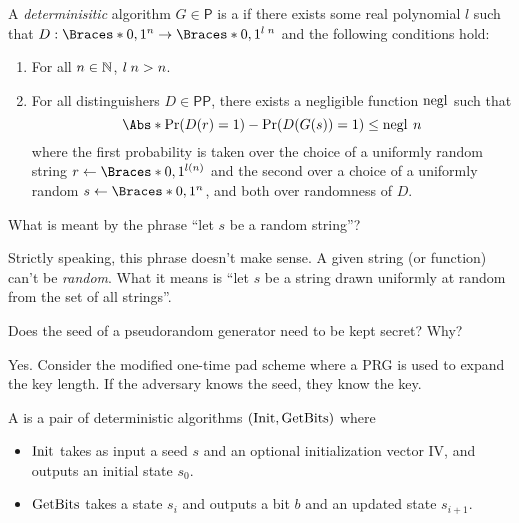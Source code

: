 \documentclass[a5paper]{article}
\begin{document}
\begin{definition}
	A \textit{determinisitic} algorithm $G\in\mathsf{P}$ is a  if there exists some real polynomial $l$ such that
  $D:\braces{0,1}^n\to\braces{0,1}^{\apply{l}{n}}$ and the following conditions hold:
  \begin{enumerate}%
    \itemsep0em
    \item {} For all $n\in\mathbb{N}$, $l\hspace{0.23em} n>n$.
    \item {} For all distinguishers $D\in\mathsf{PP}$,
      there exists a negligible function $\operatorname{negl}$ such that
      \begin{equation*}
        \abs{\Pr(D(r)=1)-\Pr(D(G(s))=1)}\leq \apply{\negl}{n}
      \end{equation*}
      where the first probability is taken over the choice of a uniformly random
      string $r\leftarrow\braces{0,1}^{l(n)}$ and the second over a choice of a
      uniformly random $s\leftarrow\braces{0,1}^n$, and both over randomness of
      $D$. 
  \end{enumerate}
\end{definition}

\begin{note}
  \begin{field}
    What is meant by the phrase ``let $s$ be a random string''?
  \end{field}

  \begin{field}
    Strictly speaking, this phrase doesn't make sense. A given string (or
    function) can't be \textit{random}. What it means is ``let $s$ be a string
    drawn uniformly at random from the set of all strings''.
  \end{field}
\end{note}

\begin{note}
  \begin{field}
    Does the seed of a pseudorandom generator need to be kept secret? Why?
  \end{field}

  \begin{field}
    Yes. Consider the modified one-time pad scheme where a PRG is used to expand
    the key length. If the adversary knows the seed, they know the key.
  \end{field}
\end{note}

\begin{definition}
	A  is a pair of deterministic algorithms $(\operatorname{Init},\operatorname{GetBits})$
  where 
  \begin{itemize}
    \itemsep0em
    \item $\operatorname{Init}$ takes as input a seed $s$ and an optional initialization
      vector IV, and outputs an initial state $s_0$.
    \item $\operatorname{GetBits}$ takes a state $s_i$ and outputs a bit $b$ and an updated
      state $s_{i+1}$.
  \end{itemize}
\end{definition}
\end{document}
